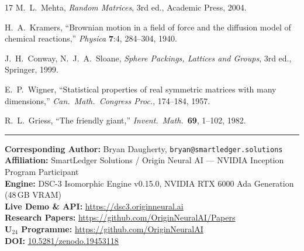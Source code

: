\documentclass[11pt,a4paper]{article}
\begin{document}
\begin{thebibliography}{17}
M.~L.~Mehta,
\emph{Random Matrices}, 3rd ed., Academic Press, 2004.

H.~A.~Kramers,
``Brownian motion in a field of force and the diffusion model of chemical reactions,''
\emph{Physica} \textbf{7}:4, 284--304, 1940.

J.~H.~Conway, N.~J.~A.~Sloane,
\emph{Sphere Packings, Lattices and Groups}, 3rd ed., Springer, 1999.

E.~P.~Wigner,
``Statistical properties of real symmetric matrices with many dimensions,''
\emph{Can.\ Math.\ Congress Proc.}, 174--184, 1957.

R.~L.~Griess,
``The friendly giant,''
\emph{Invent.\ Math.}\ \textbf{69}, 1--102, 1982.

\end{thebibliography}

\vspace{1em}\noindent\rule{\textwidth}{0.4pt}\vspace{0.5em}

\noindent\textbf{Corresponding Author:} Bryan Daugherty, \texttt{bryan@smartledger.solutions}\\
\textbf{Affiliation:} SmartLedger Solutions / Origin Neural AI --- NVIDIA Inception Program Participant\\
\textbf{Engine:} DSC-3 Isomorphic Engine v0.15.0, NVIDIA RTX 6000 Ada Generation (48\,GB VRAM)\\
\textbf{Live Demo \& API:} \url{https://dsc3.originneural.ai}\\
\textbf{Research Papers:} \url{https://github.com/OriginNeuralAI/Papers}\\
\textbf{U$_{24}$ Programme:} \url{https://github.com/OriginNeuralAI}\\
\textbf{DOI:} \href{https://doi.org/10.5281/zenodo.19453118}{10.5281/zenodo.19453118}
\end{document}
